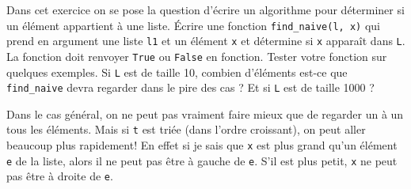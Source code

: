 \begin{enonce} 
	Dans cet exercice on se pose la question d'écrire un algorithme pour déterminer si un élément appartient à une liste.
	\quessques Écrire une fonction \texttt{find\_naive(l, x)} qui prend en argument une liste \texttt{l1} et un élément \texttt{x} et détermine si \texttt{x} apparaît dans \texttt{L}. La fonction doit renvoyer \texttt{True} ou \texttt{False} en fonction.
	\ssques Tester votre fonction sur quelques exemples.
	\ssques Si \texttt{L} est de taille 10, combien d'éléments est-ce que \texttt{find\_naive} devra regarder dans le pire des cas ? Et si \texttt{L} est de taille 1000 ?

	Dans le cas général, on ne peut pas vraiment faire mieux que de regarder un à un tous les éléments. Mais si \texttt{t} est triée (dans l'ordre croissant), on peut aller beaucoup plus rapidement! En effet si je sais que \texttt{x} est plus grand qu'un élément \texttt{e} de la liste, alors il ne peut pas être à gauche de \texttt{e}. S'il est plus petit, \texttt{x} ne peut pas être à droite de \texttt{e}.


\end{enonce}
